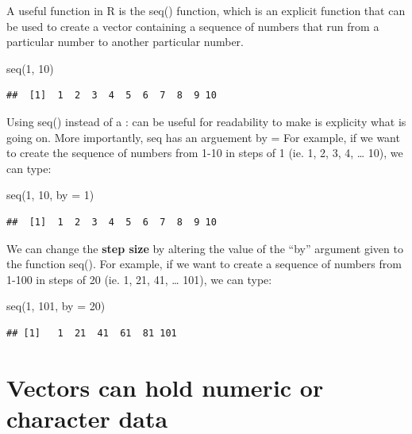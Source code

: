 \documentclass[
]{book}
\newenvironment{Shaded}{\begin{snugshade}}{\end{snugshade}}
\newcommand{\AttributeTok}[1]{\textcolor[rgb]{0.77,0.63,0.00}{#1}}
\newcommand{\DecValTok}[1]{\textcolor[rgb]{0.00,0.00,0.81}{#1}}
\newcommand{\FunctionTok}[1]{\textcolor[rgb]{0.00,0.00,0.00}{#1}}
\newcommand{\NormalTok}[1]{#1}
\begin{document}
A useful function in R is the seq() function, which is an explicit function that can be used to create a vector containing a sequence of numbers that run from a particular number to another particular number.

\begin{Shaded}
\begin{Highlighting}[]
\FunctionTok{seq}\NormalTok{(}\DecValTok{1}\NormalTok{, }\DecValTok{10}\NormalTok{)}
\end{Highlighting}
\end{Shaded}

\begin{verbatim}
##  [1]  1  2  3  4  5  6  7  8  9 10
\end{verbatim}

Using seq() instead of a : can be useful for readability to make is explicity what is going on. More importantly, seq has an arguement by = For example, if we want to create the sequence of numbers from 1-10 in steps of 1 (ie. 1, 2, 3, 4, \ldots{} 10), we can type:

\begin{Shaded}
\begin{Highlighting}[]
\FunctionTok{seq}\NormalTok{(}\DecValTok{1}\NormalTok{, }\DecValTok{10}\NormalTok{, }\AttributeTok{by =} \DecValTok{1}\NormalTok{)}
\end{Highlighting}
\end{Shaded}

\begin{verbatim}
##  [1]  1  2  3  4  5  6  7  8  9 10
\end{verbatim}

We can change the \textbf{step size} by altering the value of the ``by'' argument given to the function seq(). For example, if we want to create a sequence of numbers from 1-100 in steps of 20 (ie. 1, 21, 41, \ldots{} 101), we can type:

\begin{Shaded}
\begin{Highlighting}[]
\FunctionTok{seq}\NormalTok{(}\DecValTok{1}\NormalTok{, }\DecValTok{101}\NormalTok{, }\AttributeTok{by =} \DecValTok{20}\NormalTok{)}
\end{Highlighting}
\end{Shaded}

\begin{verbatim}
## [1]   1  21  41  61  81 101
\end{verbatim}

\hypertarget{vectors-can-hold-numeric-or-character-data}{%
\section{Vectors can hold numeric or character data}\label{vectors-can-hold-numeric-or-character-data}}
\end{document}
